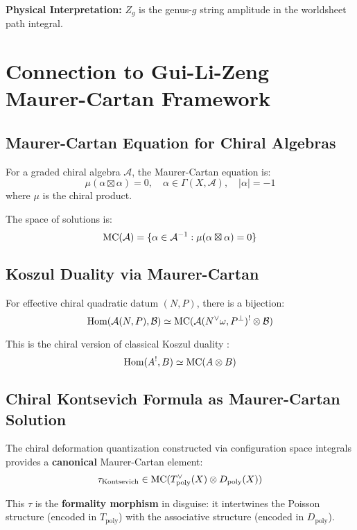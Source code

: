 \textbf{Physical Interpretation:} $Z_g$ is the genus-$g$ string amplitude in the worldsheet path integral.

\section{Connection to Gui-Li-Zeng Maurer-Cartan Framework}
\label{sec:GLZ-connection}

\subsection{Maurer-Cartan Equation for Chiral Algebras}

\begin{definition}
For a graded chiral algebra $\mathcal{A}$, the Maurer-Cartan equation is:
$$\mu(\alpha \boxtimes \alpha) = 0, \quad \alpha \in \Gamma(X, \mathcal{A}), \quad |\alpha| = -1$$
where $\mu$ is the chiral product.
\end{definition}

The space of solutions is:
$$\text{MC}(\mathcal{A}) = \{\alpha \in \mathcal{A}^{-1} : \mu(\alpha \boxtimes \alpha) = 0\}$$

\subsection{Koszul Duality via Maurer-Cartan}

\begin{theorem}
For effective chiral quadratic datum $(N,P)$, there is a bijection:
$$\text{Hom}(\mathcal{A}(N,P), \mathcal{B}) \simeq \text{MC}(\mathcal{A}(N^\vee\omega, P^\perp)^! \otimes \mathcal{B})$$
\end{theorem}

This is the chiral version of classical Koszul duality \cite{LV, GK94}:
$$\text{Hom}(A^!, B) \simeq \text{MC}(A \otimes B)$$

\subsection{Chiral Kontsevich Formula as Maurer-Cartan Solution}

The chiral deformation quantization constructed via configuration space integrals provides a \textbf{canonical} Maurer-Cartan element:
$$\tau_{\text{Kontsevich}} \in \text{MC}(T_{\text{poly}}^{\vee}(X) \otimes D_{\text{poly}}(X))$$

This $\tau$ is the \textbf{formality morphism} in disguise: it intertwines the Poisson structure (encoded in $T_{\text{poly}}$) with the associative structure (encoded in $D_{\text{poly}}$).

